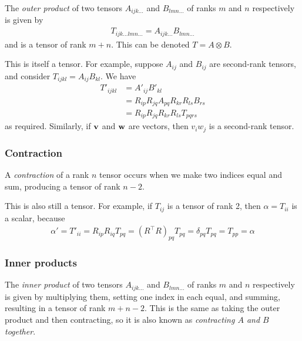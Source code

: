 \documentclass{../../template/note}
\begin{document}
    \begin{definition*}
        The \emph{outer product} of two tensors \(A_{ijk\dots}\) and \(B_{lmn\dots}\) of ranks \(m\) and \(n\) respectively is given by
        \begin{align*}
            T_{ijk\dots lmn\dots} = A_{ijk\dots}B_{lmn\dots}
        \end{align*}
        and is a tensor of rank \(m+n\). This can be denoted \(T = A \otimes B\).        
    \end{definition*}
    
    This is itself a tensor. For example, suppose \(A_{ij}\) and \(B_{ij}\) are second-rank tensors, and consider \(T_{ijkl} = A_{ij}B_{kl}\). We have
    \begin{align*}
        T'_{ijkl} &= A'_{ij}B'_{kl} \\
        &= R_{ip}R_{jq}A_{pq}R_{kr}R_{ls}B_{rs} \\
        &= R_{ip}R_{jq}R_{kr}R_{ls}T_{pqrs}
    \end{align*}
    as required. Similarly, if \(\V v\) and \(\V w\) are vectors, then \(v_i w_j\) is a second-rank tensor.    
    
    \subsubsection{Contraction}

    \begin{definition*}[Contraction]
        A \emph{contraction} of a rank \(n\) tensor occurs when we make two indices equal and sum, producing a tensor of rank \(n-2\).
    \end{definition*}
    
    This is also still a tensor. For example, if \(T_{ij}\) is a tensor of rank 2, then \(\alpha = T_{ii}\) is a scalar, because
    \begin{align*}
        \alpha' = T'_{ii} = R_{ip}R_{iq}T_{pq} = (R^\intercal R)_{pq} T_{pq} = \delta_{pq} T_{pq} = T_{pp} = \alpha
    \end{align*}
    
    \subsubsection{Inner products}

    \begin{definition*}
        The \emph{inner product} of two tensors \(A_{ijk\dots}\) and \(B_{lmn\dots}\) of ranks \(m\) and \(n\) respectively is given by multiplying them, setting one index in each equal, and summing, resulting in a tensor of rank \(m+n-2\). This is the same as taking the outer product and then contracting, so it is also known as \emph{contracting \(A\) and \(B\) together}.
    \end{definition*}
    
\end{document}
